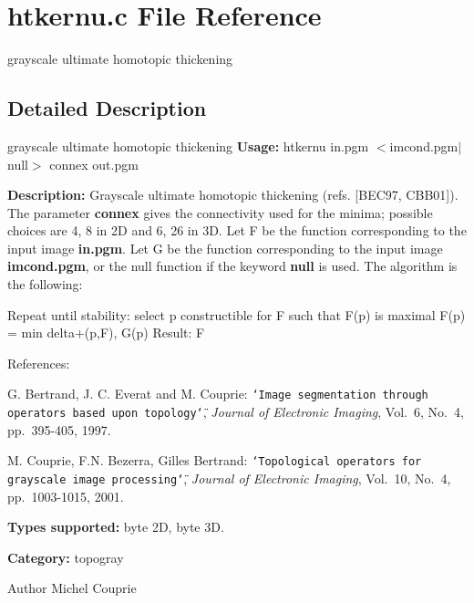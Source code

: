 \section{htkernu.c File Reference}
\label{htkernu_8c}


grayscale ultimate homotopic thickening  




\subsection{Detailed Description}
grayscale ultimate homotopic thickening {\bfseries Usage:} htkernu in.pgm $<$imcond.pgm$|$null$>$ connex out.pgm

{\bfseries Description:} Grayscale ultimate homotopic thickening (refs. [BEC97, CBB01]). The parameter {\bfseries connex} gives the connectivity used for the minima; possible choices are 4, 8 in 2D and 6, 26 in 3D. Let F be the function corresponding to the input image {\bfseries in.pgm}. Let G be the function corresponding to the input image {\bfseries imcond.pgm}, or the null function if the keyword {\bfseries null} is used. The algorithm is the following:

\begin{DoxyVerb}
Repeat until stability:
    select p constructible for F such that F(p) is maximal
    F(p) = min{ delta+(p,F), G(p) }    
Result: F
\end{DoxyVerb}


References:\par
 [BEC97] G. Bertrand, J. C. Everat and M. Couprie: {\tt \char`\"{}Image segmentation through operators based upon topology\char`\"{}}, {\itshape  Journal of Electronic Imaging\/}, Vol.~6, No.~4, pp.~395-\/405, 1997.\par
 [CBB01] M. Couprie, F.N. Bezerra, Gilles Bertrand: {\tt \char`\"{}Topological operators for
grayscale image processing\char`\"{}}, {\itshape  Journal of Electronic Imaging\/}, Vol.~10, No.~4, pp.~1003-\/1015, 2001.

{\bfseries Types supported:} byte 2D, byte 3D.

{\bfseries Category:} topogray

\begin{DoxyAuthor}{Author}
Michel Couprie 
\end{DoxyAuthor}
